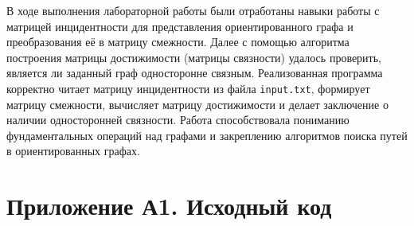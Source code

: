\documentclass[oneside,a4paper,14pt]{extarticle}
\begin{document}
В ходе выполнения лабораторной работы были отработаны навыки работы с матрицей инцидентности для представления ориентированного графа и преобразования её в матрицу смежности. Далее с помощью алгоритма построения матрицы достижимости (матрицы связности) удалось проверить, является ли заданный граф односторонне связным. Реализованная программа корректно читает матрицу инцидентности из файла \texttt{input.txt}, формирует матрицу смежности, вычисляет матрицу достижимости и делает заключение о наличии односторонней связности. Работа способствовала пониманию фундаментальных операций над графами и закреплению алгоритмов поиска путей в ориентированных графах.


\clearpage
\section*{Приложение А1. Исходный код}
\inputminted{cpp}{code/src/main.cpp}

\clearpage
\inputminted{cpp}{code/src/graphviz.hpp}

\inputminted{cpp}{code/src/graphviz.cpp}
\end{document}
